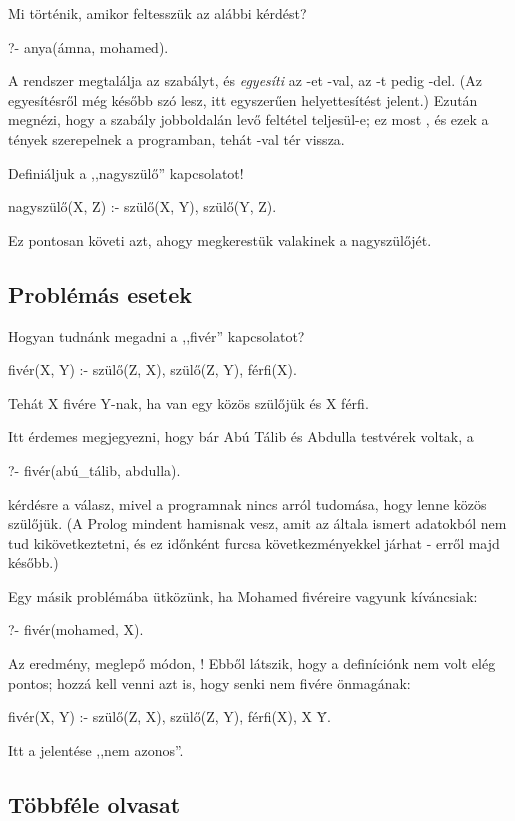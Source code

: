 Mi történik, amikor feltesszük az alábbi kérdést?
\begin{prolog}
?- anya(ámna, mohamed).
\end{prolog}
A rendszer megtalálja az  szabályt, és \emph{egyesíti} az -et -val, az -t pedig -del. (Az egyesítésről még később szó lesz, itt egyszerűen helyettesítést jelent.) Ezután megnézi, hogy a szabály jobboldalán levő feltétel teljesül-e; ez most , és ezek a tények szerepelnek a programban, tehát -val tér vissza.

Definiáljuk a ,,nagyszülő'' kapcsolatot!
\begin{prolog}
nagyszülő(X, Z) :- szülő(X, Y), szülő(Y, Z).
\end{prolog}
Ez pontosan követi azt, ahogy megkerestük valakinek a nagyszülőjét.

\subsection*{Problémás esetek}

Hogyan tudnánk megadni a ,,fivér'' kapcsolatot?
\begin{prolog}
fivér(X, Y) :- szülő(Z, X), szülő(Z, Y), férfi(X).
\end{prolog}
Tehát X fivére Y-nak, ha van egy közös szülőjük és X férfi.

Itt érdemes megjegyezni, hogy bár Abú Tálib és Abdulla testvérek voltak, a
\begin{prolog}
?- fivér(abú_tálib, abdulla).
\end{prolog}
kérdésre  a válasz, mivel a programnak nincs arról tudomása, hogy lenne közös szülőjük. (A Prolog mindent hamisnak vesz, amit az általa ismert adatokból nem tud kikövetkeztetni, és ez időnként furcsa következményekkel járhat - erről majd később.)

Egy másik problémába ütközünk, ha Mohamed fivéreire vagyunk kíváncsiak:
\begin{prolog}
?- fivér(mohamed, X).
\end{prolog}
Az eredmény, meglepő módon, ! Ebből látszik, hogy a definíciónk nem volt elég pontos; hozzá kell venni azt is, hogy senki nem fivére önmagának:
\begin{prolog}
fivér(X, Y) :- szülő(Z, X), szülő(Z, Y), férfi(X), X \= Y.
\end{prolog}
Itt a \pr{\textbackslash=} jelentése ,,nem azonos''.

\subsection*{Többféle olvasat}

